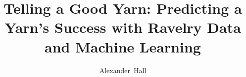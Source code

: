 \documentclass[journal]{IEEEtran}
\begin{document}
%
\title{Telling a Good Yarn: Predicting a Yarn's Success with Ravelry Data and Machine Learning}
%
%
%



\author{Alexander~Hall}


% 
%




% 
\end{document}
